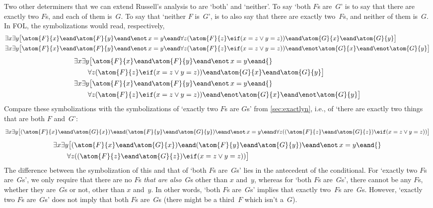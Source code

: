 Two other determiners that we can extend Russell's analysis to are
`both' and `neither'.  To say `both $F$s are~$G$' is to say that there
are exactly two $F$s, and each of them is~$G$. To say that `neither
$F$ is~$G$', is to also say that there are exactly two~$F$s, and
neither of them is~$G$. In FOL, the symbolizations would read,
respectively,
\ifHTMLtarget
\begin{align*}
	& \exists x\exists y\bigl[\atom{F}{x} \eand \atom{F}{y} \eand \enot\, {x=y} \eand 
	\forall z(\atom{F}{z} \eif (x = z \lor y = z)) \eand \atom{G}{x} \eand \atom{G}{y}\bigr]\\
	& \exists x\exists y\bigl[\atom{F}{x} \eand \atom{F}{y} \eand \enot\, {x=y} \eand 
	\forall z(\atom{F}{z} \eif (x = z \lor y = z)) \eand \enot \atom{G}{x} \eand \enot \atom{G}{y}\bigr]
\end{align*}
\else
\begin{align*}
	& \exists x\exists y\bigl[\atom{F}{x} \eand \atom{F}{y} \eand \enot\, {x=y} \eand {}\\
	& \qquad \forall z(\atom{F}{z} \eif (x = z \lor y = z)) \eand \atom{G}{x} \eand \atom{G}{y}\bigr]\\
	& \exists x\exists y\bigl[\atom{F}{x} \eand \atom{F}{y} \eand \enot\, {x=y} \eand  {}\\
	& \qquad\forall z(\atom{F}{z} \eif (x = z \lor y = z)) \eand \enot \atom{G}{x} \eand \enot \atom{G}{y}\bigr]
\end{align*}
\fi
Compare these symbolizations with the symbolizations of `exactly two $F$s are $G$s' from \cref{sec:exactlyn}, i.e., of `there are exactly two things that are both $F$ and~$G$':
\ifHTMLtarget
	\[ 
		\exists x\exists y\bigl[(\atom{F}{x} \eand \atom{G}{x}) \eand (\atom{F}{y} \eand \atom{G}{y}) \eand \enot\, {x=y} \eand 
		\forall z((\atom{F}{z} \eand \atom{G}{z}) \eif (x = z \lor y = z))\bigr]
	\]
\else
\begin{align*}
	& \exists x\exists y\bigl[(\atom{F}{x} \eand \atom{G}{x}) \eand (\atom{F}{y} \eand \atom{G}{y}) \eand \enot\, {x=y} \eand {}\\
	& \qquad\forall z((\atom{F}{z} \eand \atom{G}{z}) \eif (x = z \lor y = z))\bigr]
\end{align*}
\fi
The difference between the symbolization of this and that of `both $F$s are~$G$s' lies in the antecedent of the conditional. For `exactly two $F$s are~$G$s', we only require that there are no $F$s \emph{that are also}~$G$s other than $x$ and~$y$, whereas for `both $F$s are~$G$s', there cannot be any $F$s, whether they are~$G$s or not, other than $x$ and~$y$. In other words, `both $F$s are~$G$s' implies that exactly two~$F$s are~$G$s. However, `exactly two $F$s are~$G$s' does not imply that both $F$s are~$G$s (there might be a third~$F$ which isn't a~$G$).

